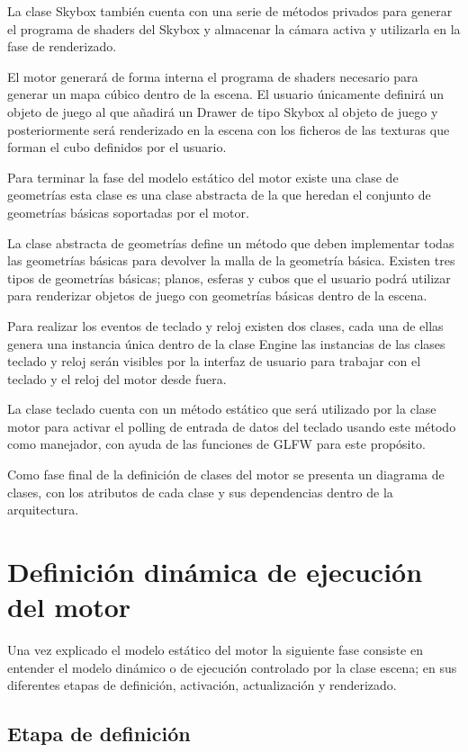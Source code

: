 \documentclass[a4paper, 17pt]{book}
\begin{document}
La clase Skybox también cuenta con una serie de métodos privados para generar el programa de shaders del Skybox y almacenar la cámara
activa y utilizarla en la fase de renderizado.

El motor generará de forma interna el programa de shaders necesario para generar un mapa cúbico dentro de la escena. El usuario únicamente
definirá un objeto de juego al que añadirá un Drawer de tipo Skybox al objeto de juego y posteriormente será renderizado en la escena con
los ficheros de las texturas que forman el cubo definidos por el usuario.

Para terminar la fase del modelo estático del motor existe una clase de geometrías esta clase es una clase abstracta de la que heredan el
conjunto de geometrías básicas soportadas por el motor. 

La clase abstracta de geometrías define un método que deben implementar todas las geometrías básicas para devolver la malla de la geometría
básica. Existen tres tipos de geometrías básicas; planos, esferas y cubos que el usuario podrá utilizar para renderizar objetos de juego con
geometrías básicas dentro de la escena.

Para realizar los eventos de teclado y reloj existen dos clases, cada una de ellas genera una instancia única dentro de la clase Engine las
instancias de las clases teclado y reloj serán visibles por la interfaz de usuario para trabajar con el teclado y el reloj del motor desde fuera.

La clase teclado cuenta con un método estático que será utilizado por la clase motor para activar el polling de entrada de datos del teclado
usando este método como manejador, con ayuda de las funciones de GLFW para este propósito.

Como fase final de la definición de clases del motor se presenta un diagrama de clases, con los atributos de cada clase y sus dependencias
dentro de la arquitectura.

\section{Definición dinámica de ejecución del motor}
\label{sec:Dinamica}

Una vez explicado el modelo estático del motor la siguiente fase consiste en entender el modelo dinámico o de ejecución controlado por la
clase escena; en sus diferentes etapas de definición, activación, actualización y renderizado.

\subsection{Etapa de definición}
\label{subsec:definicion}
\end{document}
